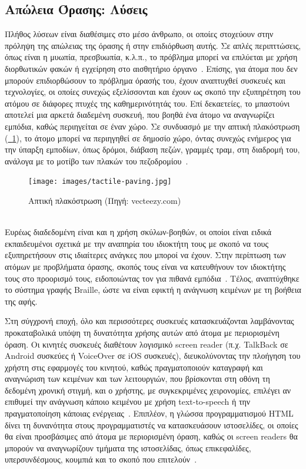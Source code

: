 \subsection{Απώλεια Όρασης: Λύσεις}\label{subsec:visionSolutions}
Πλήθος λύσεων είναι διαθέσιμες στο μέσο άνθρωπο, οι οποίες στοχεύουν στην πρόληψη της απώλειας της όρασης ή στην επιδιόρθωση αυτής. Σε απλές περιπττώσεις, όπως είναι η μυωπία, πρεσβυωπία, κ.λ.π., το πρόβλημα μπορεί να επιλύεται με χρήση διορθωτικών φακών ή εγχείρηση στο αισθητήριο όργανο~\cite{worldhealthorganization_2023_blindness}. Επίσης, για άτομα που δεν μπορούν επιδιορθώσουν το πρόβλημα όρασής του, έχουν αναπτυχθεί συσκευές και τεχνολογίες, οι οποίες συνεχώς εξελίσσονται και έχουν ως σκοπό την εξυπηρέτηση του ατόμου σε διάφορες πτυχές της καθημερινότητάς του. Επί δεκαετείες, το μπαστούνι αποτελεί μια αρκετά διαδεμένη συσκευή, που βοηθά ένα άτομο να αναγνωρίζει εμπόδια, καθώς περιηγείται σε έναν χώρο. Σε συνδυασμό με την απτική πλακόστρωση (\hyperref[fig:tactile_paving]{\schema~\ref*{fig:tactile_paving}}), το άτομο μπορεί να περιηγηθεί σε δημοσίο χώρο, όντας συνεχώς ενήμερος για την ύπαρξη εμποδίων, όπως δρόμοι, διάβαση πεζών, γραμμές τραμ, στη διαδρομή του, ανάλογα με το μοτίβο των πλακών του πεζοδρομίου~\cite{mashiata_2022_towards}.
\begin{figure}[!h]
  \centering
  \texttt{[image: images/tactile-paving.jpg]}
  \caption{Απτική πλακόστρωση {\footnotesize(Πηγή: vecteezy.com)}}\label{fig:tactile_paving}
\end{figure}\\
Ευρέως διαδεδομένη είναι και η χρήση σκύλων-βοηθών, οι οποίοι είναι ειδικά εκπαιδευμένοι σχετικά με την αναπηρία του ιδιοκτήτη τους με σκοπό να τους εξυπηρετήσουν στις ιδιαίτερες ανάγκες που μποροί να έχουν. Στην περίπτωση των ατόμων με προβλήματα όρασης, σκοπός τους είναι να κατευθήνουν τον ιδιοκτήτης τους στο προορισμό τους, ειδοποιώντας τον για πιθανά εμπόδια~\cite{illinoisuniversitylibrary_2013_libguides}. Τέλος, αναπτύχθηκε το σύστημα γραφής Braille, ώστε να είναι εφικτή η ανάγνωση κειμένων με τη βοήθεια της αφής.

Στη σύγχρονή εποχή, όλο και περισσότερες συσκευές κατασκευάζονται λαμβάνοντας προκαταβολικά υπόψη τη δυνατότητα χρήσης αυτών από άτομα με περιορισμένη όραση. Οι κινητές συσκευές διαθέτουν λογισμικό screen reader (π.χ. TalkBack σε Android συσκεύες ή VoiceOver σε iOS συσκευές), διευκολύνοντας την πλοήγηση του χρήστη στις εφαρμογές του κινητού, καθώς πραγματοποιούν καταγραφή και αναγνώριση των κειμένων και των λειτουργιών, που βρίσκονται στη οθόνη τη δεδομένη χρονική στιγμή, και ο χρήστης, με συγκεκριμένες χειρονομίες, επιλέγει αν επιθυμεί την ανάγνωση κάποιο κειμένου με χρήση text-to-speech ή την πραγματοποίηση κάποιας ενέργειας~\cite{americanfoundationfortheblind_2019_screen}. Επιπλέον, η γλώσσα προγραμματισμού HTML δίνει τη δυνανότητα στους προγραμματιστές να κατασκευάσουν ιστοσελίδες, οι οποίες θα είναι προσβάσιμες από άτομα με περιορισμένη όραση, καθώς οι screen readers θα μπορούν να αναγνωρίζουν τμήματα της ιστοσελίδας, όπως επικεφαλίδες, υπερσυνδέσμους, κουμπιά και το σκοπό που επιτελούν~\cite{w3schools_2020_html}.

